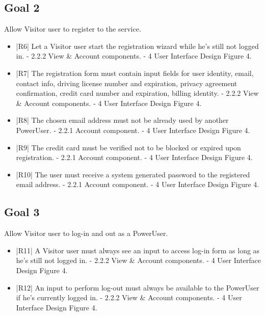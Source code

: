 \subsection {Goal 2} Allow Visitor user to register to the service.
\begin{itemize}
 \item |R6| Let a Visitor user start the registration wizard while he’s still not logged in.
    \newline - 2.2.2 View \& Account components.
    \newline - 4 User Interface Design Figure 4.
 \item |R7| The registration form must contain input fields for user identity, email, contact
info, driving license number and expiration, privacy agreement confirmation,
credit card number and expiration, billing identity.
    \newline - 2.2.2 View \& Account components.
    \newline - 4 User Interface Design Figure 4.
 \item |R8| The chosen email address must not be already used by another PowerUser.
    \newline - 2.2.1 Account component.
    \newline - 4 User Interface Design Figure 4.
 \item |R9| The credit card must be verified not to be blocked or expired upon registration.
    \newline - 2.2.1 Account component.
    \newline - 4 User Interface Design Figure 4.
 \item |R10| The user must receive a system generated password to the registered email
address.    
    \newline - 2.2.1 Account component.
    \newline - 4 User Interface Design Figure 4.
\end{itemize}

\subsection {Goal 3} Allow Visitor user to log-in and out as a PowerUser.
\begin{itemize}
 \item |R11| A Visitor user must always see an input to access log-in form as long as he’s
still not logged in.
    \newline - 2.2.2 View \& Account components.
    \newline - 4 User Interface Design Figure 4.
 \item |R12| An input to perform log-out must always be available to the PowerUser if he’s
currently logged in.
    \newline - 2.2.2 View \& Account components.
    \newline - 4 User Interface Design Figure 4.
\end{itemize}

